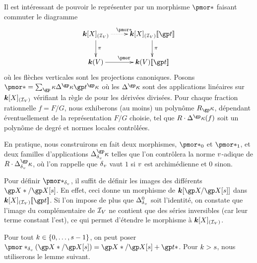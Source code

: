 Il est intéressant de pouvoir le représenter par un morphisme \( \pmor* \)
faisant commuter le diagramme
\begin{equation} \label{pmor*}
  \xymatrix{
    \cdn[X]_{(\ideal\anyvar)}                 \ar[d]^\pi \ar@{.>}[r]^{\pmor*}
    & \cdn[X]_{(\ideal\anyvar)} \series\psp   \ar[d]^\pi
    \\ \cdn(\anyvar)                                           \ar[r]^{\pmor}
    & \cdn(\anyvar)\series\psp
  }
\end{equation}
où les flèches verticales sont les projections canoniques. Posons
\( \pmor* = \sum_\derp \pdiff*^\derp \psp^\derp \) où les \( \pdiff*^\derp \)
sont des applications linéaires sur \( {\boldsymbol k}[X]_{(\mathcal I_{V})} \) vérifiant
la règle de  pour les dérivées divisées. Pour chaque fraction
rationnelle \( f = F/G \), nous exhiberons (au moins) un polynôme \( R_\derp
\), dépendant éventuellement de la représentation \( F/G \) choisie, tel que
\( R \cdot \pdiff*^\derp(f) \) soit un polynôme de degré et normes locales
contrôlées.

En pratique, nous construirons en fait deux morphismes, \( \pmor*_0 \) et \(
  \pmor*_1 \), et deux familles d'applications \( \pdiff^\derp \) telles que
l'on contrôlera la norme \( v \)-adique de \( R \cdot \pdiff^\derp \), où
l'on rappelle que \( {\delta\smash{_v}} \) vaut \( 1 \) si \( v \) est archimédienne et
\( 0 \) sinon.

Pour définir \( \pmor*_\dv \), il suffit de définir les images des différents
\( \vp* / \vp[\anydim] \). En effet, ceci donne un morphisme de \( \cdn[ \vp /
  \vp[\anydim] ] \) dans \( \cdn[X]_{(\ideal\anyvar)} \series\psp \). Si l'on
impose de plus que \( \pdiff^0 \) soit l'identité, on constate que l'image du
complémentaire de \( \mathcal I_{V} \) ne contient que des séries inversibles
(car leur terme constant l'est), ce qui permet d'étendre le morphisme à \(
  {\boldsymbol k}[X]_{(\mathcal I_{V})} \).

Pour tout \( k \in \lbrace0, \dots, s-1\rbrace \), on peut poser \(
  \pmor*_\dv(\vp*/\vp[\anydim]) = \vp*/\vp[\anydim] + \psp* \). Pour \( k >
  s \), nous utiliserons le lemme suivant.

